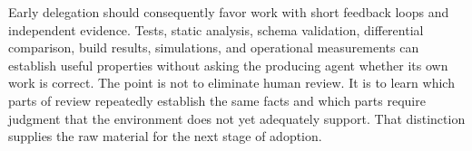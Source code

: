 Early delegation should consequently favor work with short feedback loops and independent evidence. Tests, static analysis, schema validation, differential comparison, build results, simulations, and operational measurements can establish useful properties without asking the producing agent whether its own work is correct. The point is not to eliminate human review. It is to learn which parts of review repeatedly establish the same facts and which parts require judgment that the environment does not yet adequately support. That distinction supplies the raw material for the next stage of adoption.
